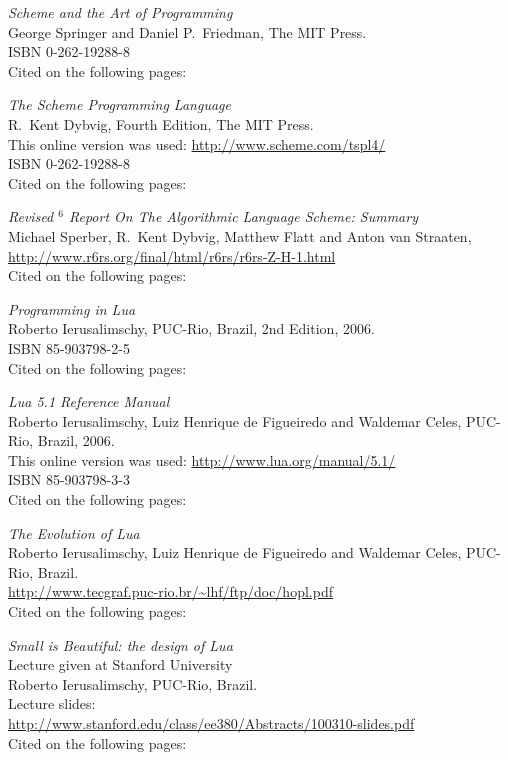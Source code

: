 \begin{thebibliography}{9}

  \emph{Scheme and the Art of Programming} \\
  George Springer and Daniel P.\ Friedman,
  The MIT Press. \\
  ISBN 0-262-19288-8 \\
  Cited on the following pages: 

  \emph{The Scheme Programming Language} \\
  R.\ Kent Dybvig,
  Fourth Edition,
  The MIT Press. \\
  This online version was used: \url{http://www.scheme.com/tspl4/} \\
  ISBN 0-262-19288-8 \\
  Cited on the following pages: 

  \emph{Revised $^6$ Report On The Algorithmic Language Scheme: Summary} \\
  Michael Sperber, R.\ Kent Dybvig, Matthew Flatt and Anton van Straaten, \\
  \url{http://www.r6rs.org/final/html/r6rs/r6rs-Z-H-1.html} \\
  Cited on the following pages: 

  \emph{Programming in Lua} \\
  Roberto Ierusalimschy,
  PUC-Rio, Brazil,
  2nd Edition,
  2006. \\
  ISBN 85-903798-2-5 \\
  Cited on the following pages: 
  
  \emph{Lua 5.1 Reference Manual} \\
  Roberto Ierusalimschy, Luiz Henrique de Figueiredo and Waldemar Celes,
  PUC-Rio, Brazil,
  2006. \\
  This online version was used: \url{http://www.lua.org/manual/5.1/} \\
  ISBN 85-903798-3-3 \\
  Cited on the following pages: 
  
  \emph{The Evolution of Lua} \\
  Roberto Ierusalimschy, Luiz Henrique de Figueiredo and Waldemar Celes,
  PUC-Rio, Brazil. \\
  \url{http://www.tecgraf.puc-rio.br/~lhf/ftp/doc/hopl.pdf} \\
  Cited on the following pages: 
  
  \emph{Small is Beautiful: the design of Lua} \\
  Lecture given at Stanford University \\
  Roberto Ierusalimschy,
  PUC-Rio, Brazil. \\
  Lecture slides: \\
  \url{http://www.stanford.edu/class/ee380/Abstracts/100310-slides.pdf} \\
  Cited on the following pages: 


\end{thebibliography}

